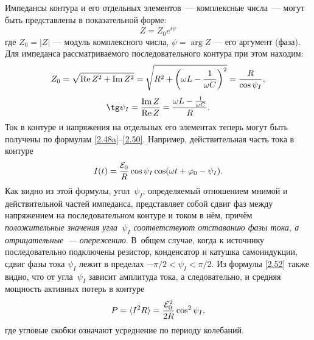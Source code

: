 Импедансы контура и его отдельных элементов~--- комплексные числа~--- могут быть
представлены в показательной форме:
\begin{equation}
Z = Z_0 e^{i\psi}
\end{equation}
где $Z_0 = |Z|$ --- модуль комплексного числа, 
$\psi = \arg Z$ --- его аргумент (фаза).
Для импеданса рассматриваемого
последовательного контура при этом находим:
		\begin{equation}
			\eqmark{2.51a}
    Z_0=\sqrt{\Re Z^2 + \Im Z^2}=\sqrt{R^2+\left(\omega L-\frac{1}{\omega C}\right)^2}=\frac{R}{\cos\psi_I},
		\end{equation}
		\begin{equation}
			\eqmark{2.51b}
	\tg\psi_I=\frac{\Im Z}{\Re Z}=\frac{\omega L-\frac{1}{\omega C}}{R}.
		\end{equation}
Ток в контуре и напряжения на отдельных его элементах теперь
могут быть получены по формулам \eqref{2.48a}--\eqref{2.50}. Например,
действительная часть тока в контуре
\begin{equation}
	\eqmark{2.52}
	I(t)=\frac{\mathcal{E}_0}{R}\cos\psi_I\cos(\omega t+\varphi_0-\psi_I).
\end{equation}
Как видно из этой формулы, угол~$\psi_I$, определяемый отношением мнимой и
действительной частей импеданса, представляет собой сдвиг фаз между напряжением
на последовательном контуре и током в нём, причём \emph{положительные
значения угла~$\psi_I$ соответствуют отставанию фазы тока, а
отрицательные~--- опережению}. В~общем случае, когда к источнику последовательно
подключены резистор, конденсатор и катушка самоиндукции, сдвиг фазы тока
$\psi_I$ лежит в пределах $-\pi/2<\psi_I<\pi/2$. Из формулы \eqref{2.52} также
видно, что от угла~$\psi_I$ зависит амплитуда тока, а следовательно, и средняя
мощность активных потерь в контуре
\begin{equation}\eqmark{2.53}
	P=\langle I^2R\rangle=\frac{\mathcal{E}_0^2}{2R}\cos^2\psi_I,
\end{equation}
где угловые скобки означают усреднение по периоду колебаний.


\label{sec:vectordia}

